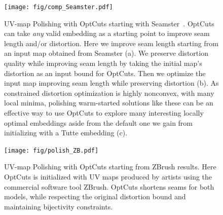 \begin{figure}[t]
\centering
\texttt{[image: fig/comp\_Seamster.pdf]}
\vspace{-0.3cm}
\caption{UV-map Polishing with OptCuts starting with Seamster~\cite{Sheffer2002Seamster}. OptCuts can take \emph{any} valid embedding as a starting point to improve seam length and/or distortion. Here we improve seam length starting from an input map obtained from Seamster (a). We preserve distortion quality while improving seam length by taking the initial map's distortion as an input bound for OptCuts. Then we optimize the input map improving seam length while preserving distortion (b). As constrained distortion optimization is highly nonconvex, with many local minima, polishing warm-started solutions like these can be an effective way to use OptCuts to explore many interesting locally optimal embeddings aside from the default one we gain from initializing with a Tutte embedding (c).}
\vspace{-0.3cm}
\label{fig:comp_Seamster}
\end{figure}

\begin{figure}[t]
\centering
\texttt{[image: fig/polish\_ZB.pdf]}
\vspace{-0.3cm}
\caption{UV-map Polishing with OptCuts starting from ZBrush results. Here OptCuts is initialized with UV maps produced by artists using the commercial software tool ZBrush. OptCuts shortens seams for both models, while respecting the original distortion bound and maintaining bijectivity constraints.}
\vspace{-0.3cm}
\label{fig:polish_zbrush}
\end{figure}


